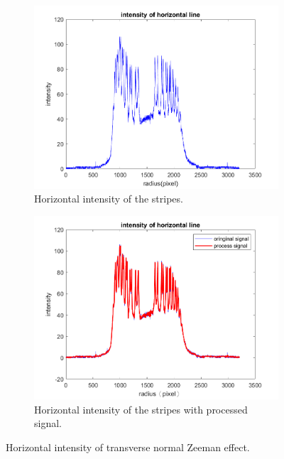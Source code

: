 \documentclass[a4paper,12pt]{article}
\begin{document}
    \begin{figure}[H]
        \centering
        \begin{subfigure}[b]{0.48\textwidth}
            \includegraphics[width=\textwidth]{horizontal_intensity_43.png}
            \caption{Horizontal intensity of the stripes.}
        \end{subfigure}
        \begin{subfigure}[b]{0.48\textwidth}
            \includegraphics[width=\textwidth]{horizontal_intensity__processed_43.png}
            \caption{Horizontal intensity of the stripes with processed signal.}
        \end{subfigure}
        \caption{Horizontal intensity of transverse normal Zeeman effect.}
        \label{fig:horizontal intensity}
    \end{figure}
    
\end{document}
